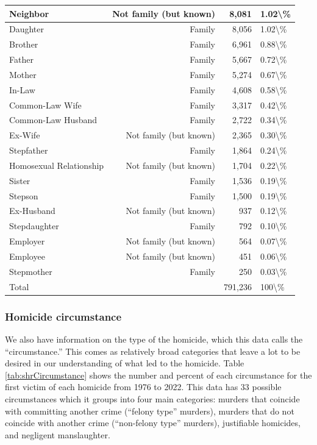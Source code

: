 \documentclass[
]{krantz}
\begin{document}
\begin{longtable}[t]{l|r|r|l}
\hline
Neighbor & Not family (but known) & 8,081 & 1.02\textbackslash{}\%\\
\hline
Daughter & Family & 8,056 & 1.02\textbackslash{}\%\\
\hline
Brother & Family & 6,961 & 0.88\textbackslash{}\%\\
\hline
Father & Family & 5,667 & 0.72\textbackslash{}\%\\
\hline
Mother & Family & 5,274 & 0.67\textbackslash{}\%\\
\hline
In-Law & Family & 4,608 & 0.58\textbackslash{}\%\\
\hline
Common-Law Wife & Family & 3,317 & 0.42\textbackslash{}\%\\
\hline
Common-Law Husband & Family & 2,722 & 0.34\textbackslash{}\%\\
\hline
Ex-Wife & Not family (but known) & 2,365 & 0.30\textbackslash{}\%\\
\hline
Stepfather & Family & 1,864 & 0.24\textbackslash{}\%\\
\hline
Homosexual Relationship & Not family (but known) & 1,704 & 0.22\textbackslash{}\%\\
\hline
Sister & Family & 1,536 & 0.19\textbackslash{}\%\\
\hline
Stepson & Family & 1,500 & 0.19\textbackslash{}\%\\
\hline
Ex-Husband & Not family (but known) & 937 & 0.12\textbackslash{}\%\\
\hline
Stepdaughter & Family & 792 & 0.10\textbackslash{}\%\\
\hline
Employer & Not family (but known) & 564 & 0.07\textbackslash{}\%\\
\hline
Employee & Not family (but known) & 451 & 0.06\textbackslash{}\%\\
\hline
Stepmother & Family & 250 & 0.03\textbackslash{}\%\\
\hline
Total &  & 791,236 & 100\textbackslash{}\%\\
\hline
\end{longtable}

\subsubsection{Homicide circumstance}\label{circumstance}

We also have information on the type of the homicide, which
this data calls the ``circumstance.'' This comes as
relatively broad categories that leave a lot to be desired
in our understanding of what led to the homicide. Table
\ref{tab:shrCircumstance} shows the number and percent of
each circumstance for the first victim of each homicide from
1976 to 2022. This data has 33 possible circumstances which
it groups into four main categories: murders that coincide
with committing another crime (``felony type'' murders),
murders that do not coincide with another crime
(``non-felony type'' murders), justifiable homicides, and
negligent manslaughter.
\end{document}
